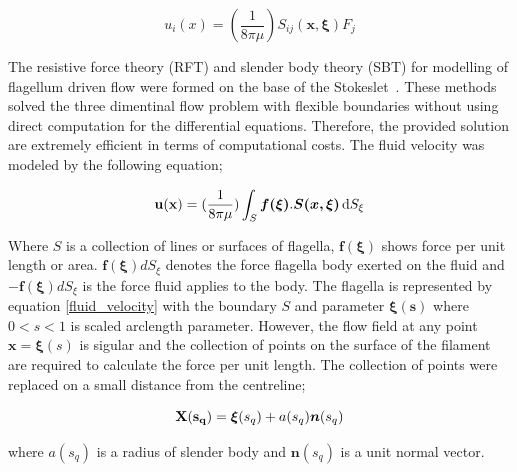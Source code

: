 \documentclass[12pt,a4paper,titlepage]{report}
\begin{document}
\begin{equation}
 u_i(x) =(\frac{1}{8 \pi \mu}) S_{ij}\bm{( x, \xi)} F_j
\label{velocity}
\end{equation}

The resistive force theory (RFT) and slender body theory (SBT) for modelling of flagellum driven 
flow were formed on the base of the Stokeslet~\citep{smith2009boundary}. These methods solved the 
three dimentinal flow problem with flexible boundaries without using direct computation for the differential
equations. Therefore, the provided solution are extremely efficient in terms of computational costs. The fluid
velocity was modeled by the following equation;
   


\begin{equation}
\bold {u(x)} =(\frac{1}{8 \pi \mu}) \int_S \mathrm \bm{f(\xi)} . \bm{S( x, \xi)}\, \mathrm{d}S_{\xi}
\label{fluid_velocity}
\end{equation}

Where $S$ is a collection of lines or surfaces of flagella, $\bm{f(\xi)}$ shows force per unit length or area.
$\bm{f(\xi)} dS_{\xi}$ denotes the force flagella body exerted on the fluid and $-\bm{f(\xi)} dS_{\xi}$ is the 
force fluid applies to the body. The flagella is represented by equation \ref{fluid_velocity} with the boundary
$S$ and parameter $\bm{\xi (s)}$ where $0 < s <1$ is scaled arclength parameter. However, the flow field
at any point $\bm{x} = \bm{\xi} (s)$ is sigular and the collection of points on the surface of the filament 
are required to calculate the force per unit length. The collection of points were replaced on a small distance 
from the centreline;

\begin{equation}
\bold {X(s_q)} = \bm{\xi}(s_q) + a(s_q) \bm{n}(s_q)
\label{centreline}
\end{equation}

where $a(s_q)$ is a radius of slender body and $\bm{n}(s_q)$ is a unit normal vector.
\end{document}
